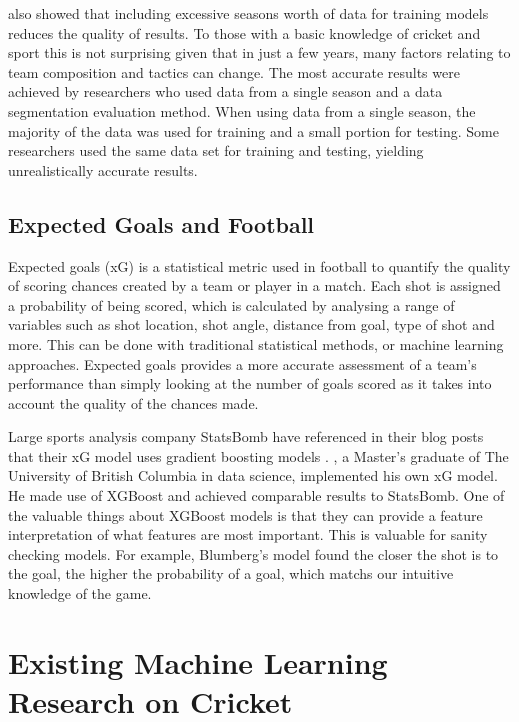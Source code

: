 \documentclass[12pt,a4paper]{report}
\theoremstyle{definition}
\begin{document}
\citet{horvat2020} also showed that including excessive seasons worth of data for training models reduces the quality of results. 
To those with a basic knowledge of cricket and sport this is not surprising given that in just a few years, many factors relating to team composition and tactics can change. 
The most accurate results were achieved by researchers who used data from a single season and a data segmentation evaluation method. 
When using data from a single season, the majority of the data was used for training and a small portion for testing. 
Some researchers used the same data set for training and testing, yielding unrealistically accurate results.

\subsection{Expected Goals and Football}

Expected goals (xG) is a statistical metric used in football to quantify the quality of scoring chances created by a team or player in a match. 
Each shot is assigned a probability of being scored, which is calculated by analysing a range of variables such as shot location, shot angle, distance from goal, type of shot and more. 
This can be done with traditional statistical methods, or machine learning approaches.
Expected goals provides a more accurate assessment of a team's performance than simply looking at the number of goals scored as it takes into account the quality of the chances made.

Large sports analysis company StatsBomb have referenced in their blog posts that their xG model uses gradient boosting models \citep{statsbomb2022}. 
\citet{Blumberg2020}, a Master's graduate of The University of British Columbia in data science, implemented his own xG model.
He made use of XGBoost \citep{Chen2016} and achieved comparable results to StatsBomb.
One of the valuable things about XGBoost models is that they can provide a feature interpretation of what features are most important.
This is valuable for sanity checking models.
For example, Blumberg's model found the closer the shot is to the goal, the higher the probability of a goal, which matchs our intuitive knowledge of the game.

\section{Existing Machine Learning Research on Cricket} \label{sec:CrickSurvey}
\end{document}
